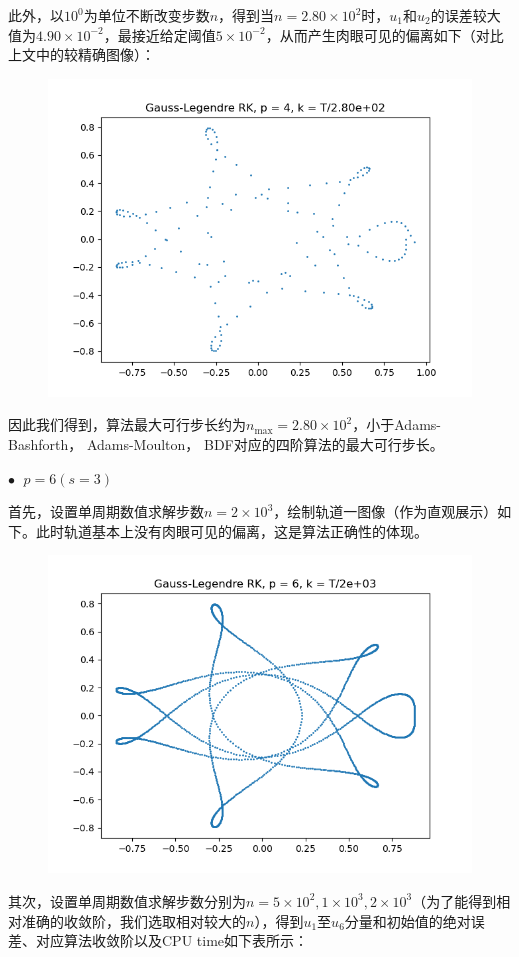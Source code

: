 \documentclass{ctexart}
\begin{document}
\begin{sloppypar}
此外，以$10^0$为单位不断改变步数$n$，得到当$n = 2.80 \times 10^2$时，$u_1$和$u_2$的误差较大值为$4.90 \times 10^{-2}$，最接近给定阈值$5 \times 10^{-2}$，从而产生肉眼可见的偏离如下（对比上文中的较精确图像）：
\begin{figure}[H]
\centering
\includegraphics[scale = 0.45]{./report_src/Figure_71.png}
\end{figure}
因此我们得到，算法最大可行步长约为$n_{\max} = 2.80 \times 10^2$，小于Adams-Bashforth， Adams-Moulton， BDF对应的四阶算法的最大可行步长。

$\bullet \;$ $p = 6(s=3)$

首先，设置单周期数值求解步数$n = 2 \times 10^3$，绘制轨道一图像（作为直观展示）如下。此时轨道基本上没有肉眼可见的偏离，这是算法正确性的体现。
\begin{figure}[H]
\centering
\includegraphics[scale = 0.45]{./report_src/Figure_72.png}
\end{figure}
其次，设置单周期数值求解步数分别为$n = 5 \times 10^2,1 \times 10^3,2 \times 10^3$（为了能得到相对准确的收敛阶，我们选取相对较大的$n$），得到$u_1$至$u_6$分量和初始值的绝对误差、对应算法收敛阶以及CPU time如下表所示：


\end{sloppypar}
\end{document}

